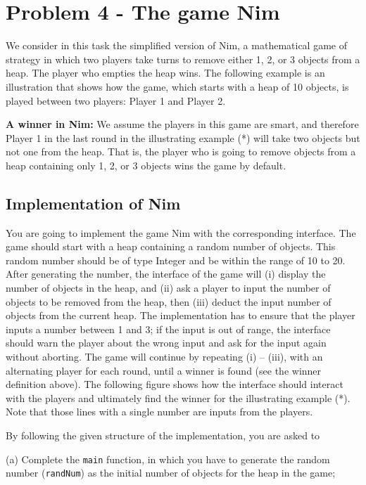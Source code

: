 \documentclass{article}
\begin{document}
    \section{Problem 4 - The game Nim}
    We consider in this task the simplified version of Nim, a mathematical game of strategy in which two players take turns to remove either 1, 2, or 3 objects from a heap. The player who empties the heap wins. The following example is an illustration that shows how the game, which starts with a heap of 10 objects, is played between two players: Player 1 and Player 2.
    \medskip

    \textbf{A winner in Nim:} We assume the players in this game are smart, and therefore Player 1 in the last round in the illustrating example (*) will take two objects but not one from the heap. That is, the player who is going to remove objects from a heap containing only 1, 2, or 3 objects wins the game by default.

    \subsection{Implementation of Nim}
    You are going to implement the game Nim with the corresponding interface.
The game should start with a heap containing a random number of objects. This random number should be of type Integer and be within the range of 10 to 20. After generating the number, the interface of the game will (i) display the number of objects in the heap, and (ii) ask a player to input the number of objects to be removed from the heap, then (iii) deduct the input number of objects from the current heap. The implementation has to ensure that the player inputs a number between 1 and 3; if the input is out of range, the interface should warn the player about the wrong input and ask for the input again without aborting. The game will continue by repeating (i) – (iii), with an alternating player for each round, until a winner is found (see the winner definition above). The following figure shows how the interface should interact with the players and ultimately find the winner for the illustrating example (*). Note that those lines with a single number are inputs from the players.

By following the given structure of the implementation, you are asked to

(a) Complete the \texttt{main} function, in which you have to generate the random number (\texttt{randNum}) as the initial number of objects for the heap in the game;
\end{document}
